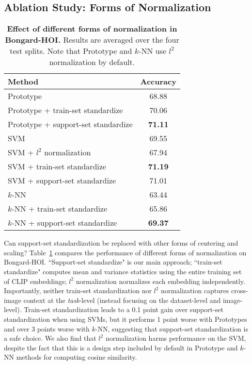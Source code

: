 \subsection{Ablation Study: Forms of Normalization}
\begin{table}
  \centering
    \begin{tabular}{lc}
    \toprule
    Method & Accuracy \\
    \midrule
    Prototype & 68.88  \\
    Prototype + train-set standardize &   70.06  \\
    Prototype + support-set standardize &  \textbf{71.11}  \\
    \midrule
    SVM & 69.55 \\
    SVM + $l^2$ normalization & 67.94 \\
    SVM + train-set standardize & \textbf{71.19} \\
    SVM + support-set standardize & 71.01 \\
    \midrule
    $k$-NN & 63.44 \\
    $k$-NN + train-set standardize & 65.86 \\
    $k$-NN + support-set standardize & \textbf{69.37} \\
    \bottomrule
  \end{tabular}
    \caption{\textbf{Effect of different forms of normalization in Bongard-HOI.} Results are averaged over the four test splits. Note that Prototype and $k$-NN use $l^2$ normalization by default. 
    }
  \label{tab:norm}


\end{table}

Can support-set standardization be replaced with other forms of centering and scaling?  
Table~\ref{tab:norm} compares the performance of different forms of normalization on Bongard-HOI. ``Support-set standardize" is our main approach; ``train-set standardize" computes mean and variance statistics using the entire training set of CLIP embeddings; $l^2$ normalization normalizes each embedding independently.
Importantly, neither train-set standardization nor $l^2$ normalization captures cross-image context at the \textit{task}-level (instead focusing on the dataset-level and image-level).
Train-set standardization leads to a 0.1 point gain over support-set standardization when using SVMs, but it performs 1 point worse with Prototypes and over 3 points worse with $k$-NN, suggesting that support-set standardization is a safe choice. We also find that $l^2$ normalization harms performance on the SVM, despite the fact that this is a design step included by default in Prototype and $k$-NN methods for computing cosine similarity.
